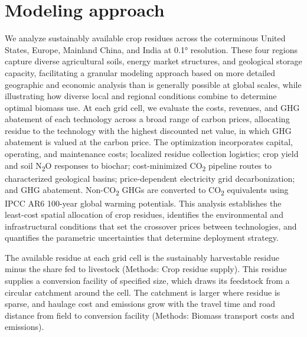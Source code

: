 \documentclass[
  letterpaper,
  twoside,
  twocolumn,
  9pt]{article}
\begin{document}
\section{Modeling approach}\label{modeling-approach}

We analyze sustainably available crop residues across the coterminous
United States, Europe, Mainland China, and India at 0.1° resolution.
These four regions capture diverse agricultural soils, energy market
structures, and geological storage capacity, facilitating a granular
modeling approach based on more detailed geographic and economic
analysis than is generally possible at global scales, while illustrating
how diverse local and regional conditions combine to determine optimal
biomass use. At each grid cell, we evaluate the costs, revenues, and GHG
abatement of each technology across a broad range of carbon prices,
allocating residue to the technology with the highest discounted net
value, in which GHG abatement is valued at the carbon price. The
optimization incorporates capital, operating, and maintenance costs;
localized residue collection logistics; crop yield and soil
N\textsubscript{2}O responses to biochar; cost-minimized
CO\textsubscript{2} pipeline routes to characterized geological basins;
price-dependent electricity grid decarbonization; and GHG abatement.
Non-CO\textsubscript{2} GHGs are converted to CO\textsubscript{2}
equivalents using IPCC AR6 100-year global warming
potentials.\citep{forster2021} This analysis establishes the least-cost
spatial allocation of crop residues, identifies the environmental and
infrastructural conditions that set the crossover prices between
technologies, and quantifies the parametric uncertainties that determine
deployment strategy.

The available residue at each grid cell is the sustainably harvestable
residue minus the share fed to livestock (Methods: Crop residue supply).
This residue supplies a conversion facility of specified size, which
draws its feedstock from a circular catchment around the cell. The
catchment is larger where residue is sparse, and haulage cost and
emissions grow with the travel time and road distance from field to
conversion facility (Methods: Biomass transport costs and emissions).
\end{document}
